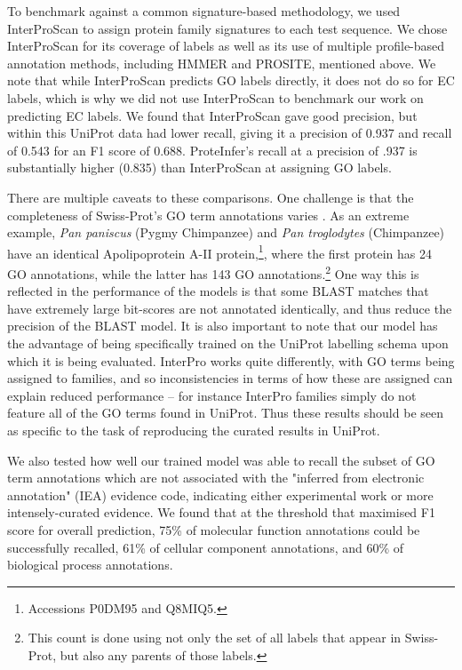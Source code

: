 To benchmark against a common signature-based methodology, we used InterProScan to assign protein family signatures to each test sequence. We chose InterProScan for its coverage of labels as well as its use of multiple profile-based annotation methods, including HMMER and PROSITE, mentioned above. We note that while InterProScan predicts GO labels directly, it does not do so for EC labels, which is why we did not use InterProScan to benchmark our work on predicting EC labels. We found that InterProScan gave good precision, but within this UniProt data had lower recall, giving it a precision of 0.937 and recall of 0.543 for an F1 score of 0.688. ProteInfer's recall at a precision of .937 is substantially higher (0.835) than InterProScan at assigning GO labels.  

There are multiple caveats to these comparisons. One challenge is that the completeness of Swiss-Prot's GO term annotations varies \cite{jiang2014impact}. As an extreme example, \textit{Pan paniscus} (Pygmy Chimpanzee) and \textit{Pan troglodytes} (Chimpanzee) have an identical Apolipoprotein A-II protein,\footnote{Accessions P0DM95 and Q8MIQ5.}, where the first protein has 24 GO annotations, while the latter has 143 GO annotations.\footnote{This count is done using not only the set of all labels that appear in Swiss-Prot, but also any parents of those labels.} One way this is reflected in the performance of the models is that some BLAST matches that have extremely large bit-scores are not annotated identically, and thus reduce the precision of the BLAST model. It is also important to note that our model has the advantage of being specifically trained on the UniProt labelling schema upon which it is being evaluated. InterPro works quite differently, with GO terms being assigned to families, and so inconsistencies in terms of how these are assigned can explain reduced performance -- for instance InterPro families simply do not feature all of the GO terms found in UniProt. Thus these results should be seen as specific to the task of reproducing the curated results in UniProt.


We also tested how well our trained model was able to recall the subset of GO term annotations which are not associated with the "inferred from electronic annotation" (IEA) evidence code, indicating either experimental work or more intensely-curated evidence. We found that at the threshold that maximised F1 score for overall prediction, 75\% of molecular function annotations could be successfully recalled, 61\% of cellular component annotations, and 60\% of biological process annotations.


